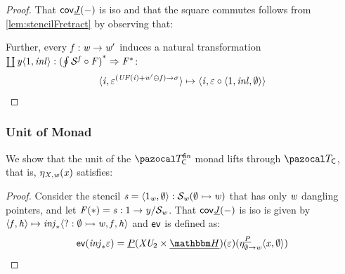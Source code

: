 \begin{proof}
That $\mathsf{cov}{\underline{\mathit{J}}(-)}$ is iso and that the square commutes follows from \cref{lem:stencilFretract} by observing that:
\begin{center}
\end{center}
Further, every $\mathit{f} : \mathit{w} \to \mathit{w}'$ induces a natural transformation $\coprod{\mathit{y}\langle 1 , \mathit{inl}\rangle} : {(\oint{\mathcal{S}^{\mathit{f}}} \circ \mathit{F})}^* \Rightarrow {\mathit{F}}^*$:
\[    \langle \mathit{i} , \varepsilon^{(\mathit{U}\mathit{F}(\mathit{i}) + \mathit{w}' \ominus \mathit{f}) \to \sigma} \rangle \mapsto \langle \mathit{i} , \varepsilon \circ \langle 1,\mathit{inl},\emptyset \rangle \rangle \]

\end{proof}

\subsubsection{Unit of Monad}

We show that the unit of the $\monFLSfin$ monad lifts through $\monFLSCtx$, that is, $\eta_{\mathit{X},\mathit{w}}(\mathit{x})$ satisfies: 
\begin{center}
\end{center}
\begin{proof}
    Consider the stencil $\mathit{s} = \langle 1_{\mathit{w}} , \emptyset \rangle : \mathcal{S}_{\mathit{w}}(\emptyset \rightarrowtail \mathit{w})$ that has only $\mathit{w}$ dangling pointers, and let $\mathit{F}(*) = \mathit{s} : 1 \to {\mathit{y}}/{\mathcal{S}_{\mathit{w}}}$.
    That $\mathsf{cov}{\underline{\mathit{J}}(-)}$ is iso is given by $\langle \mathit{f} , \mathit{h} \rangle \mapsto \mathit{inj}_{*}{\langle ? : \emptyset \rightarrowtail \mathit{w},\mathit{f},\mathit{h} \rangle}$ and $\mathsf{ev}$ is defined as:
    \[ \ev\nop(\inj{*}\varepsilon) = \dhideMon(\vX\vU_2 \times \dheapF)(\varepsilon)(\eta^{\dhideMon}_{\emptyset \to \vw}\tup{\vx}\emptyset) \]
\end{proof}

